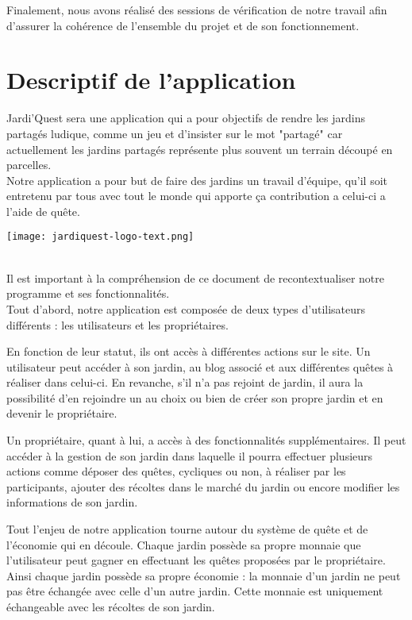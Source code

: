 \documentclass[12pt,titlepage]{report}
\begin{document}
Finalement, nous avons réalisé des sessions de vérification de notre travail afin d’assurer la cohérence de l’ensemble du projet et de son fonctionnement.

\chapter{Descriptif de l’application}

Jardi'Quest sera une application qui a pour objectifs de rendre les jardins partagés ludique, comme un jeu et d'insister sur le mot "partagé" car actuellement les jardins partagés représente plus souvent un terrain découpé en parcelles. \\ 
Notre application a pour but de faire des jardins un travail d'équipe, qu'il soit entretenu par tous avec tout le monde qui apporte ça contribution a celui-ci a l'aide de quête. \\ 


\begin{center}
    \texttt{[image: jardiquest-logo-text.png]} 
\end{center}
\\[0.6cm]


Il est important à la compréhension de ce document de recontextualiser notre programme et ses fonctionnalités.\\[0.4cm]

Tout d’abord,  notre application est composée de deux types d’utilisateurs différents : les utilisateurs et les propriétaires.

En fonction de leur statut, ils ont accès à différentes actions sur le site.
Un utilisateur peut accéder à son jardin, au blog associé et aux différentes quêtes à réaliser dans celui-ci. En revanche, s’il n’a pas rejoint de jardin, il aura la possibilité d’en rejoindre un au choix ou bien de créer son propre jardin et en devenir le propriétaire.

Un propriétaire, quant à lui, a accès à des fonctionnalités supplémentaires. Il peut accéder à la gestion de son jardin dans laquelle il pourra effectuer plusieurs actions comme déposer des quêtes, cycliques ou non, à réaliser par les participants, ajouter des récoltes dans le marché du jardin ou encore modifier les informations de son jardin.

Tout l’enjeu de notre application tourne autour du système de quête et de l’économie qui en découle. Chaque jardin possède sa propre monnaie que l’utilisateur peut gagner en effectuant les quêtes proposées par le propriétaire. Ainsi chaque jardin possède sa propre économie : la monnaie d’un jardin ne peut pas être échangée avec celle d’un autre jardin. Cette monnaie est uniquement échangeable avec les récoltes de son jardin. \\ \\
\end{document}

